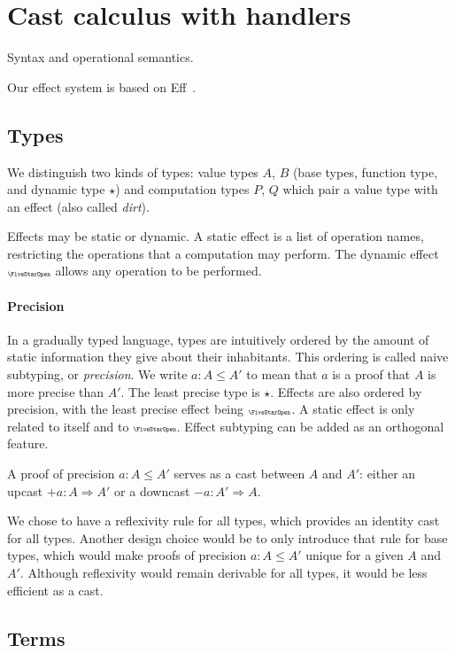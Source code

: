 \section{Cast calculus with handlers}

Syntax and operational semantics.

Our effect system is based on Eff~\cite{bauer2015programming}.

\subsection{Types}

We distinguish two kinds of types: value types $A$, $B$ (base types, function type, and
dynamic type $\star$) and computation types $P$, $Q$ which pair a value type with an effect (also called \emph{dirt}).

Effects may be static or dynamic. A static effect is a list of operation names,
restricting the operations that a computation may perform. The dynamic effect $\effany$
allows any operation to be performed.

\paragraph{Precision}
In a gradually typed language, types are intuitively ordered by the amount of
static information they give about their inhabitants. This ordering is called
naive subtyping, or \emph{precision}.
We write $a : A \le A'$ to mean that $a$ is a proof that $A$ is more precise than $A'$.
The least precise type is $\star$.
Effects are also ordered by precision, with the least precise effect being $\effany$.
A static effect is only related to itself and to $\effany$.
Effect subtyping can be added as an orthogonal feature.

A proof of precision $a : A \le A'$ serves as a cast between $A$ and $A'$:
either an upcast $+a : A \Rightarrow A'$ or a downcast $-a : A' \Rightarrow A$.

We chose to have a reflexivity rule for all types, which provides an
identity cast for all types. Another design choice would be to only introduce
that rule for base types, which would make proofs of precision $a : A \le A'$
unique for a given $A$ and $A'$. Although reflexivity would remain derivable
for all types, it would be less efficient as a cast.

\subsection{Terms}

